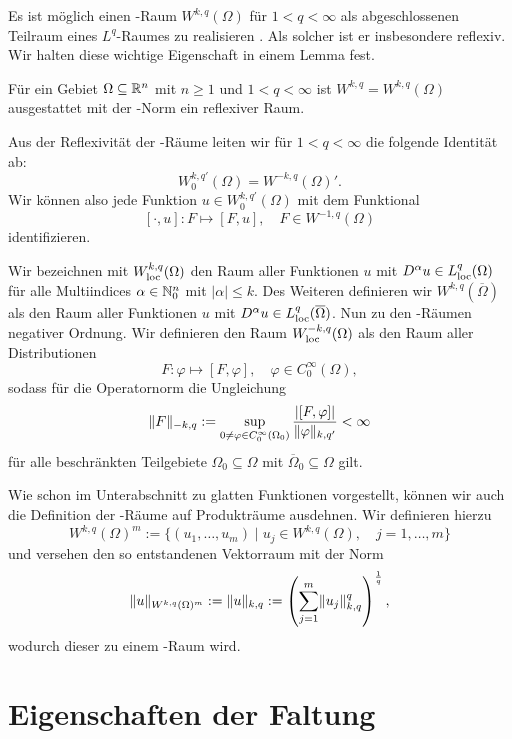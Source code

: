 Es ist möglich einen \sobolev\hyp{}Raum $W^{k,q}(\Omega)$ für $1 < q < \infty$ als abgeschlossenen Teilraum eines $L^q$\hyp{}Raumes zu realisieren \cite[S.61, 3.5]{adams2003sobolev}.
Als solcher ist er insbesondere reflexiv.
Wir halten diese wichtige Eigenschaft in einem Lemma fest.

\begin{lem}
  Für ein Gebiet $\Omega \subseteq \mathbb{R}^n$ mit $n \geq 1$ und $1 < q < \infty$ ist $W^{k,q} = W^{k,q}(\Omega)$ ausgestattet mit der \sobolev\hyp{}Norm ein reflexiver Raum.
\end{lem}

Aus der Reflexivität der \sobolev\hyp{}Räume leiten wir für $1 < q < \infty$ die folgende Identität ab:
$$
  W_0^{k,q'}(\Omega) = W^{-k,q}(\Omega)'.
$$
Wir können also jede Funktion $u \in W_0^{k,q'}(\Omega)$ mit dem Funktional
$$
[\cdot, u] \colon F \mapsto [F, u], \quad F \in W^{-1,q}(\Omega)
$$
identifizieren.

Wir bezeichnen mit $W^{k,q}_{\operatorname{loc}}(\Omega)$ den Raum aller Funktionen $u$ mit $D^\alpha u \in L^q_{\operatorname{loc}}(\Omega)$ für alle Multiindices $\alpha \in \mathbb{N}_0^n$ mit $|\alpha| \leq k$.
Des Weiteren definieren wir $W^{k,q}(\overline\Omega)$ als den Raum aller Funktionen $u$ mit $D^\alpha u \in L^q_{\operatorname{loc}}(\overline\Omega)$.
Nun zu den \sobolev\hyp{}Räumen negativer Ordnung. 
Wir definieren den Raum $W^{-k,q}_{\operatorname{loc}}(\Omega)$ als den Raum aller Distributionen
$$
F \colon \varphi \mapsto [F,\varphi], \quad \varphi \in C_0^\infty(\Omega),
$$
sodass für die Operatornorm die Ungleichung
\begin{equation}
  \label{eq:operatornorm}
\lVert F \rVert_{-k,q} := \sup_{0 \neq \varphi \in C_0^\infty(\Omega_0)}  \frac{|[F,\varphi]|}{\lVert \varphi \rVert_{k,q'}} < \infty
\end{equation}
für alle beschränkten Teilgebiete $\Omega_0 \subseteq \Omega$ mit $\overline\Omega_0 \subseteq \Omega$ gilt.

Wie schon im Unterabschnitt zu glatten Funktionen vorgestellt, können wir auch die Definition der \sobolev\hyp{}Räume auf Produkträume ausdehnen. 
Wir definieren hierzu
$$
W^{k,q}(\Omega)^m := \{ (u_1,\dots,u_m) \mid u_j \in W^{k,q}(\Omega), \quad j = 1,\dots, m\}
$$
und versehen den so entstandenen Vektorraum mit der Norm
$$
\lVert u \rVert_{W^{k,q}(\Omega)^m} 
:= \lVert u \rVert_{k,q}
:= \left( \sum_{j = 1}^m \lVert u_j \rVert_{k,q}^q \right)^{\frac{1}{q}},
$$
wodurch dieser zu einem \banach\hyp{}Raum wird.


\newpage
\section{Eigenschaften der Faltung}
\label{subsec:mollification}

